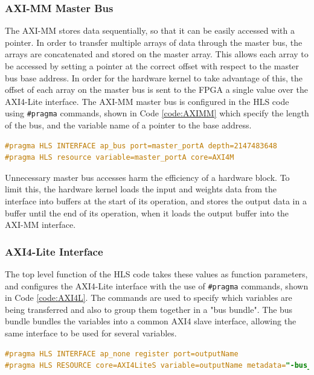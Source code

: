 \documentclass[12pt]{article}
\begin{document}
\subsubsection{AXI-MM Master Bus}
\label{sec:Design-PSnPL-AXIMM}

The AXI-MM stores data sequentially, so that it can be easily accessed with a pointer. In order to transfer multiple arrays of data through the master bus, the arrays are concatenated and stored on the master array. This allows each array to be accessed by setting a pointer at the correct offset with respect to the master bus base address. In order for the hardware kernel to take advantage of this, the offset of each array on the master bus is sent to the FPGA a single value over the AXI4-Lite interface. The AXI-MM master bus is configured in the HLS code using \lstinline|#pragma| commands, shown in Code \ref{code:AXIMM} which specify the length of the bus, and the variable name of a pointer to the base address.

\begin{lstlisting}[caption=Commands to configure AXI-MM master bus, label=code:AXIMM, language=C,deletekeywords={register}]
#pragma HLS INTERFACE ap_bus port=master_portA depth=2147483648
#pragma HLS resource variable=master_portA core=AXI4M
\end{lstlisting}

Unnecessary master bus accesses harm the efficiency of a hardware block. To limit this, the hardware kernel loads the input and weights data from the interface into buffers at the start of its operation, and stores the output data in a buffer until the end of its operation, when it loads the output buffer into the AXI-MM interface.


\subsubsection{AXI4-Lite Interface}
\label{sec:Design-PSnPL-AXI4L}

The top level function of the HLS code takes these values as function parameters, and configures the AXI4-Lite interface with the use of \lstinline|#pragma| commands, shown in Code \ref{code:AXI4L}. The commands are used to specify which variables are being transferred and also to group them together in a "bus bundle". The bus bundle bundles the variables into a common AXI4 slave interface, allowing the same interface to be used for several variables. 

\begin{lstlisting}[caption=Commands to configure AXI4-Lite bus, label=code:AXI4L, language=C,deletekeywords={register}]
#pragma HLS INTERFACE ap_none register port=outputName
#pragma HLS RESOURCE core=AXI4LiteS variable=outputName metadata="-bus_bundle CONFIG_BUS"
\end{lstlisting}
\end{document}
